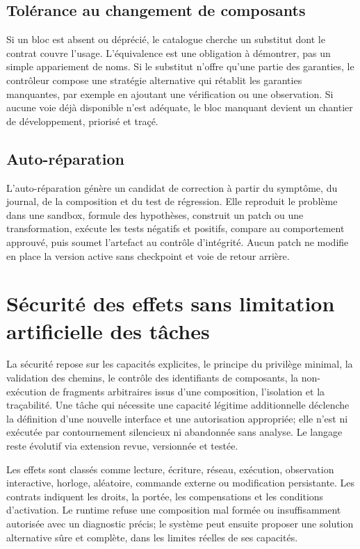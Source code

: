 \documentclass[11pt,a4paper]{article}
\begin{document}
\subsection{Tolérance au changement de composants}
Si un bloc est absent ou déprécié, le catalogue cherche un substitut dont le contrat couvre l'usage. L'équivalence est une obligation à démontrer, pas un simple appariement de noms. Si le substitut n'offre qu'une partie des garanties, le contrôleur compose une stratégie alternative qui rétablit les garanties manquantes, par exemple en ajoutant une vérification ou une observation. Si aucune voie déjà disponible n'est adéquate, le bloc manquant devient un chantier de développement, priorisé et traçé.

\subsection{Auto-réparation}
L'auto-réparation génère un candidat de correction à partir du symptôme, du journal, de la composition et du test de régression. Elle reproduit le problème dans une sandbox, formule des hypothèses, construit un patch ou une transformation, exécute les tests négatifs et positifs, compare au comportement approuvé, puis soumet l'artefact au contrôle d'intégrité. Aucun patch ne modifie en place la version active sans checkpoint et voie de retour arrière.

\section{Sécurité des effets sans limitation artificielle des tâches}
La sécurité repose sur les capacités explicites, le principe du privilège minimal, la validation des chemins, le contrôle des identifiants de composants, la non-exécution de fragments arbitraires issus d'une composition, l'isolation et la traçabilité. Une tâche qui nécessite une capacité légitime additionnelle déclenche la définition d'une nouvelle interface et une autorisation appropriée; elle n'est ni exécutée par contournement silencieux ni abandonnée sans analyse. Le langage reste évolutif via extension revue, versionnée et testée.

Les effets sont classés comme lecture, écriture, réseau, exécution, observation interactive, horloge, aléatoire, commande externe ou modification persistante. Les contrats indiquent les droits, la portée, les compensations et les conditions d'activation. Le runtime refuse une composition mal formée ou insuffisamment autorisée avec un diagnostic précis; le système peut ensuite proposer une solution alternative sûre et complète, dans les limites réelles de ses capacités.
\end{document}
